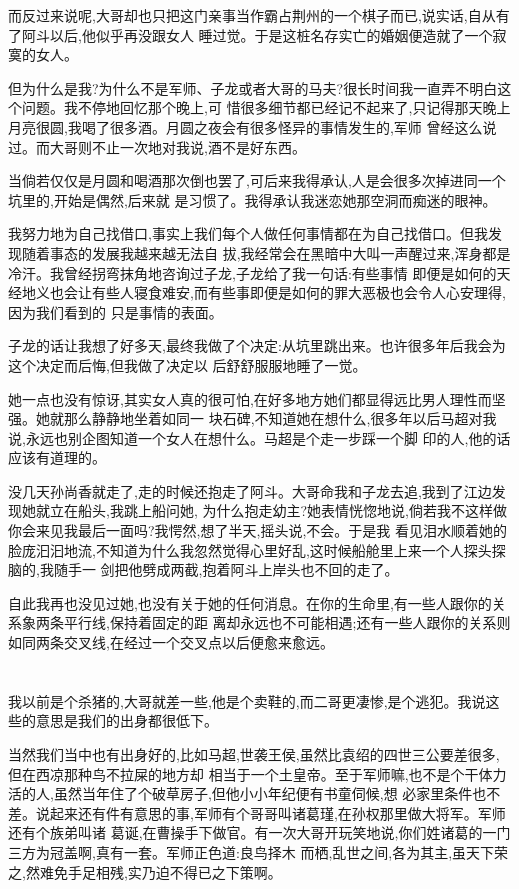 ﻿\documentclass[12pt,twocolumn]{article}
\begin{document}
而反过来说呢,大哥却也只把这门亲事当作霸占荆州的一个棋子而已,说实话,自从有了阿斗以后,他似乎再没跟女人
睡过觉。于是这桩名存实亡的婚姻便造就了一个寂寞的女人。

但为什么是我?为什么不是军师、子龙或者大哥的马夫?很长时间我一直弄不明白这个问题。我不停地回忆那个晚上,可
惜很多细节都已经记不起来了,只记得那天晚上月亮很圆,我喝了很多酒。月圆之夜会有很多怪异的事情发生的,军师
曾经这么说过。而大哥则不止一次地对我说,酒不是好东西。

当倘若仅仅是月圆和喝酒那次倒也罢了,可后来\dldots 我得承认,人是会很多次掉进同一个坑里的,开始是偶然,后来就
是习惯了。我得承认我迷恋她那空洞而痴迷的眼神。

我努力地为自己找借口,事实上我们每个人做任何事情都在为自己找借口。但我发现随着事态的发展我越来越无法自
拔,我经常会在黑暗中大叫一声醒过来,浑身都是冷汗。我曾经拐弯抹角地咨询过子龙,子龙给了我一句话:有些事情
即便是如何的天经地义也会让有些人寝食难安,而有些事即便是如何的罪大恶极也会令人心安理得,因为我们看到的
只是事情的表面。

子龙的话让我想了好多天,最终我做了个决定:从坑里跳出来。也许很多年后我会为这个决定而后悔,但我做了决定以
后舒舒服服地睡了一觉。

她一点也没有惊讶,其实女人真的很可怕,在好多地方她们都显得远比男人理性而坚强。她就那么静静地坐着如同一
块石碑,不知道她在想什么,很多年以后马超对我说,永远也别企图知道一个女人在想什么。马超是个走一步踩一个脚
印的人,他的话应该有道理的。

没几天孙尚香就走了,走的时候还抱走了阿斗。大哥命我和子龙去追,我到了江边发现她就立在船头,我跳上船问她,
为什么抱走幼主?她表情恍惚地说,倘若我不这样做你会来见我最后一面吗?我愕然,想了半天,摇头说,不会。于是我
看见泪水顺着她的脸庞汩汩地流,不知道为什么我忽然觉得心里好乱,这时候船舱里上来一个人探头探脑的,我随手一
剑把他劈成两截,抱着阿斗上岸头也不回的走了。

自此我再也没见过她,也没有关于她的任何消息。在你的生命里,有一些人跟你的关系象两条平行线,保持着固定的距
离却永远也不可能相遇;还有一些人跟你的关系则如同两条交叉线,在经过一个交叉点以后便愈来愈远。

\section{}

我以前是个杀猪的,大哥就差一些,他是个卖鞋的,而二哥更凄惨,是个逃犯。我说这些的意思是我们的出身都很低下。

当然我们当中也有出身好的,比如马超,世袭王侯,虽然比袁绍的四世三公要差很多,但在西凉那种鸟不拉屎的地方却
相当于一个土皇帝。至于军师嘛,也不是个干体力活的人,虽然当年住了个破草房子,但他小小年纪便有书童伺候,想
必家里条件也不差。说起来还有件有意思的事,军师有个哥哥叫诸葛瑾,在孙权那里做大将军。军师还有个族弟叫诸
葛诞,在曹操手下做官。有一次大哥开玩笑地说,你们姓诸葛的一门三方为冠盖啊,真有一套。军师正色道:良鸟择木
而栖,乱世之间,各为其主,虽天下荣之,然难免手足相残,实乃迫不得已之下策啊。
\end{document}
